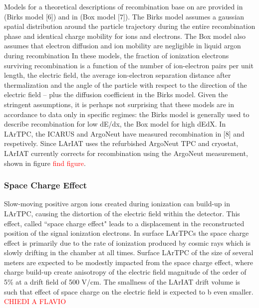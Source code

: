 Models for a theoretical descriptions of recombination base on are provided in (Birks model [6]) and in (Box model [7]). The Birks model assumes a gaussian spatial distribution around the particle trajectory during the entire recombination phase and identical charge mobility for ions and electrons. The Box model also assumes that electron diffusion and ion mobility are negligible in liquid argon during recombination
In these models, the fraction of ionization electrons surviving recombination is a function of the number of ion-electron pairs per unit length, the electric field, the average ion-electron separation distance after thermalization and the angle of the particle with respect to the direction of the electric field -- plus the diffusion coefficient in the Birks model. Given the stringent assumptions, it is perhaps  not surprising that these models are in accordance to data only in specific regimes: the Birks model is generally used to describe recombination for low dE/dx, the Box model for high dEdX.
In LArTPC, the ICARUS and ArgoNeut have measured recombination in [8] and \cite{1748-0221-8-08-P08005} respetively. Since LArIAT uses the refurbished ArgoNeut TPC and cryostat,  LArIAT currently corrects for recombination using the ArgoNeut measurement, shown in figure \textcolor{red}{find figure}.


\subsubsection{Space Charge Effect}
Slow-moving positive argon ions created during ionization can build-up in LArTPC, causing the distortion of the
electric field within the detector. This effect, called  ``space charge effect" leads to a displacement in the reconstructed position of the signal ionization electrons. In surface LArTPCs the space charge effect is primarily due to the rate of ionization produced by cosmic rays which is slowly drifting in the chamber at all times. Surface LArTPC of the size of several meters are expected to be modestly impacted from the space charge effect, where charge build-up create anisotropy of the electric field magnitude of the order of  5\% at a drift field of 500 V/cm. The smallness of the LArIAT drift volume is such that  effect of  space charge on the electric field is expected to b even smaller. \textcolor{red}{CHIEDI A FLAVIO}

